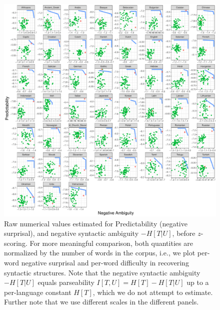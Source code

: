 \documentclass[10pt,twoside,lineno]{article}
\begin{document}


\begin{figure}
\centering
\includegraphics[width=\textwidth]{../results/plane/pareto-plane-perLanguage-raw.pdf}
	\caption[Predictability and Parseability]{Raw numerical values estimated for Predictability (negative surprisal), and negative syntactic ambiguity $-H[T|U]$, before $z$-scoring. For more meaningful comparison, both quantities are normalized by the number of words in the corpus, i.e., we plot per-word negative surprisal and per-word difficulty in recovering syntactic structures.  Note that the negative syntactic ambiguity $-H[T|U]$ equals parseability $I[T,U] = H[T] - H[T|U]$ up to a per-language constant $H[T]$, which we do not attempt to estimate. Further note that we use different scales in the different panels. }\label{fig:pareto-per-lang-raw}
\end{figure}
\end{document}
